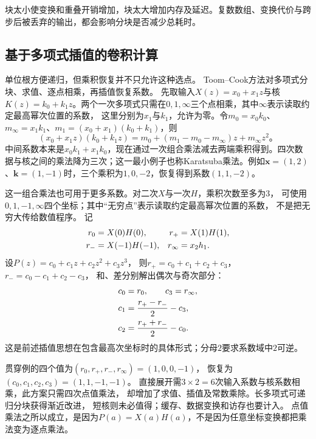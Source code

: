 块太小使变换和重叠开销增加，块太大增加内存及延迟。复数数组、变换代价与跨步后被丢弃的输出，都会影响分块是否减少总耗时。

\subsection{基于多项式插值的卷积计算}\label{sec:signal-analysis-fast-toom}\label{sec:cnn-toom-cook}

单位根方便递归，但乘积恢复并不只允许这种选点。
Toom--Cook方法对多项式分块、求值、逐点相乘，再插值恢复系数。
先取输入$X(z)=x_0+x_1z$与核$K(z)=k_0+k_1z$。两个一次多项式只需在$0,1,\infty$三个点相乘，其中$\infty$表示读取约定最高幂次位置的系数，
这里分别为$x_1$与$k_1$，允许为零。令$m_0=x_0k_0$、$m_\infty=x_1k_1$、$m_1=(x_0+x_1)(k_0+k_1)$，则
\begin{equation}
  (x_0+x_1z)(k_0+k_1z)
  =m_0+(m_1-m_0-m_\infty)z+m_\infty z^2\text{。}
  \label{eq:cnn-toom-example}
\end{equation}
中间系数本来是$x_0k_1+x_1k_0$，现在通过一次组合乘法减去两端乘积得到。四次数据与核之间的乘法降为三次；这一最小例子也称Karatsuba乘法。例如$\bm x=(1,2)$、$\bm k=(1,-1)$时，三个乘积为$1,0,-2$，恢复得到系数$(1,1,-2)$。


这一组合乘法也可用于更多系数。对二次$X$与一次$H$，乘积次数至多为$3$，
可使用$0,1,-1,\infty$四个坐标；其中“无穷点”表示读取约定最高幂次位置的系数，
不是把无穷大传给数值程序。
记
\begin{align}
  r_0&=X(0)H(0),&r_+&=X(1)H(1),\notag\\
  r_-&=X(-1)H(-1),&r_\infty&=x_2h_1.\label{eq:cnn-toom-three-two-evaluation}
\end{align}
设$P(z)=c_0+c_1z+c_2z^2+c_3z^3$，
则$r_+=c_0+c_1+c_2+c_3$，$r_-=c_0-c_1+c_2-c_3$，
和、差分别解出偶次与奇次部分：
\begin{align}
  c_0&=r_0,\qquad c_3=r_\infty,\notag\\
  c_1&=\frac{r_+-r_-}{2}-c_3,\notag\\
  c_2&=\frac{r_++r_-}{2}-c_0.
  \label{eq:signal-analysis-toom-reconstruction}
\end{align}
\BookEquationAliases{\label{eq:cnn-toom-three-two-recovery}}
这是前述插值思想在包含最高次坐标时的具体形式；分母$2$要求系数域中$2$可逆。

贯穿例的四个值为$(r_0,r_+,r_-,r_\infty)=(1,0,0,-1)$，
恢复为$(c_0,c_1,c_2,c_3)=(1,1,-1,-1)$。
直接展开需$3\times2=6$次输入系数与核系数相乘，此方案只需四次点值乘法，
却增加了求值、插值及常数乘除。长多项式可递归分块获得渐近改进，
短核则未必值得；缓存、数据变换和访存也要计入。
点值乘法之所以成立，是因为$P(a)=X(a)H(a)$，不是因为任意坐标变换都把乘法变为逐点乘法。

